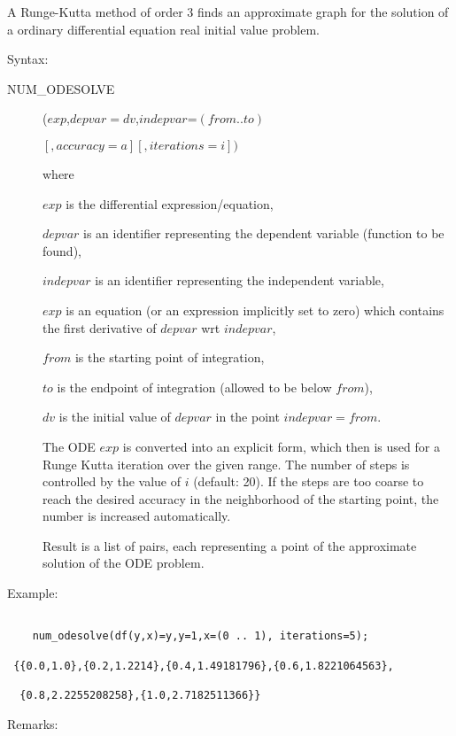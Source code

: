 A Runge-Kutta method of order 3 finds an approximate graph for
the solution of a ordinary differential equation
real initial value problem.

Syntax:
\begin{description}
\item[NUM\_ODESOLVE]($exp$,$depvar=dv$,$indepvar$=$(from .. to)$

$                   [,accuracy=a][,iterations=i]) $

where

$exp$ is the differential expression/equation,

$depvar$ is an identifier representing the dependent variable
(function to be found),

$indepvar$ is an identifier representing the independent variable,

$exp$ is an equation (or an expression implicitly set to zero) which
contains the first derivative of $depvar$ wrt $indepvar$,

$from$ is the starting point of integration,

$to$ is the endpoint of integration (allowed to be below $from$),

$dv$ is the initial value of $depvar$ in the point $indepvar=from$.

The ODE $exp$ is converted into an explicit form, which then is
used for a Runge Kutta iteration over the given range. The
number of steps is controlled by the value of $i$
(default: 20).
If the steps are too coarse to reach the desired
accuracy in the neighborhood of the starting point, the number is
increased automatically.

Result is a list of pairs, each representing a point of the
approximate solution of the ODE problem.
\end{description}


Example:

\begin{verbatim}

    num_odesolve(df(y,x)=y,y=1,x=(0 .. 1), iterations=5);

 {{0.0,1.0},{0.2,1.2214},{0.4,1.49181796},{0.6,1.8221064563},

  {0.8,2.2255208258},{1.0,2.7182511366}}

\end{verbatim}

Remarks:

